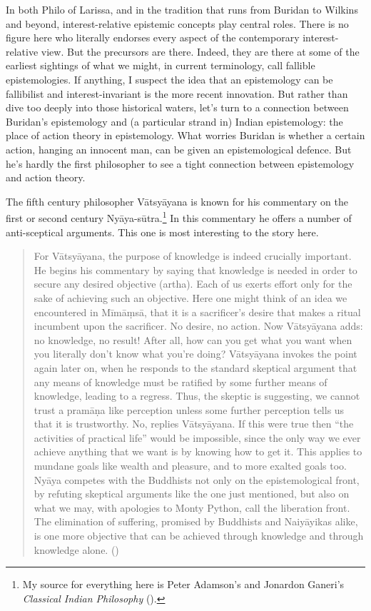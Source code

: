 \documentclass[
  12pt,
  letterpaper,
]{scrbook}
\begin{document}
In both Philo of Larissa, and in the tradition that runs from Buridan to
Wilkins and beyond, interest-relative epistemic concepts play central
roles. There is no figure here who literally endorses every aspect of
the contemporary interest-relative view. But the precursors are there.
Indeed, they are there at some of the earliest sightings of what we
might, in current terminology, call fallible epistemologies. If
anything, I suspect the idea that an epistemology can be fallibilist and
interest-invariant is the more recent innovation. But rather than dive
too deeply into those historical waters, let's turn to a connection
between Buridan's epistemology and (a particular strand in) Indian
epistemology: the place of action theory in epistemology. What worries
Buridan is whether a certain action, hanging an innocent man, can be
given an epistemological defence. But he's hardly the first philosopher
to see a tight connection between epistemology and action theory.

The fifth century philosopher Vātsyāyana is known for his commentary on
the first or second century Nyāya-sūtra.\footnote{My source for
  everything here is Peter Adamson's and Jonardon Ganeri's
  \emph{Classical Indian Philosophy}
  ().} In this
commentary he offers a number of anti-sceptical arguments. This one is
most interesting to the story here.

\begin{quote}
For Vātsyāyana, the purpose of knowledge is indeed crucially important.
He begins his commentary by saying that knowledge is needed in order to
secure any desired objective (artha). Each of us exerts effort only for
the sake of achieving such an objective. Here one might think of an idea
we encountered in Mīmāṃsā, that it is a sacrificer's desire that makes a
ritual incumbent upon the sacrificer. No desire, no action. Now
Vātsyāyana adds: no knowledge, no result! After all, how can you get
what you want when you literally don't know what you're doing?
Vātsyāyana invokes the point again later on, when he responds to the
standard skeptical argument that any means of knowledge must be ratified
by some further means of knowledge, leading to a regress. Thus, the
skeptic is suggesting, we cannot trust a pramāṇa like perception unless
some further perception tells us that it is trustworthy. No, replies
Vātsyāyana. If this were true then ``the activities of practical life''
would be impossible, since the only way we ever achieve anything that we
want is by knowing how to get it. This applies to mundane goals like
wealth and pleasure, and to more exalted goals too. Nyāya competes with
the Buddhists not only on the epistemological front, by refuting
skeptical arguments like the one just mentioned, but also on what we
may, with apologies to Monty Python, call the liberation front. The
elimination of suffering, promised by Buddhists and Naiyāyikas alike, is
one more objective that can be achieved through knowledge and through
knowledge alone. ()
\end{quote}
\end{document}
